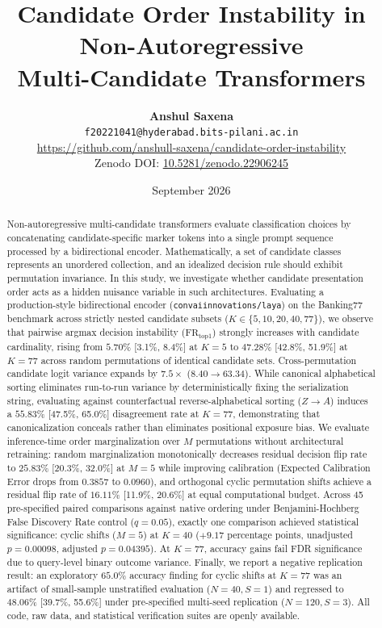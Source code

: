 \documentclass[11pt,a4paper]{article}
\title{\textbf{Candidate Order Instability in Non-Autoregressive\\Multi-Candidate Transformers}}
\author{
  \textbf{Anshul Saxena} \\
  \texttt{f20221041@hyderabad.bits-pilani.ac.in} \\
  \url{https://github.com/anshull-saxena/candidate-order-instability} \\
  \small{Zenodo DOI: \href{https://doi.org/10.5281/zenodo.22906245}{10.5281/zenodo.22906245}}
}
\date{September 2026}
\begin{document}
\maketitle

\begin{abstract}
Non-autoregressive multi-candidate transformers evaluate classification choices by concatenating candidate-specific marker tokens into a single prompt sequence processed by a bidirectional encoder. Mathematically, a set of candidate classes represents an unordered collection, and an idealized decision rule should exhibit permutation invariance. In this study, we investigate whether candidate presentation order acts as a hidden nuisance variable in such architectures. Evaluating a production-style bidirectional encoder (\texttt{convaiinnovations/laya}) on the Banking77 benchmark across strictly nested candidate subsets ($K \in \{5, 10, 20, 40, 77\}$), we observe that pairwise argmax decision instability ($\mathrm{FR}_{\mathrm{top1}}$) strongly increases with candidate cardinality, rising from $5.70\%$ [3.1\%, 8.4\%] at $K=5$ to $47.28\%$ [42.8\%, 51.9\%] at $K=77$ across random permutations of identical candidate sets. Cross-permutation candidate logit variance expands by $7.5\times$ ($8.40 \to 63.34$). While canonical alphabetical sorting eliminates run-to-run variance by deterministically fixing the serialization string, evaluating against counterfactual reverse-alphabetical sorting ($Z \to A$) induces a $55.83\%$ [47.5\%, 65.0\%] disagreement rate at $K=77$, demonstrating that canonicalization conceals rather than eliminates positional exposure bias. We evaluate inference-time order marginalization over $M$ permutations without architectural retraining: random marginalization monotonically decreases residual decision flip rate to $25.83\%$ [20.3\%, 32.0\%] at $M=5$ while improving calibration (Expected Calibration Error drops from $0.3857$ to $0.0960$), and orthogonal cyclic permutation shifts achieve a residual flip rate of $16.11\%$ [11.9\%, 20.6\%] at equal computational budget. Across 45 pre-specified paired comparisons against native ordering under Benjamini-Hochberg False Discovery Rate control ($q=0.05$), exactly one comparison achieved statistical significance: cyclic shifts ($M=5$) at $K=40$ ($+9.17$ percentage points, unadjusted $p=0.00098$, adjusted $p=0.04395$). At $K=77$, accuracy gains fail FDR significance due to query-level binary outcome variance. Finally, we report a negative replication result: an exploratory $65.0\%$ accuracy finding for cyclic shifts at $K=77$ was an artifact of small-sample unstratified evaluation ($N=40, S=1$) and regressed to $48.06\%$ [39.7\%, 55.6\%] under pre-specified multi-seed replication ($N=120, S=3$). All code, raw data, and statistical verification suites are openly available.
\end{abstract}
\end{document}
